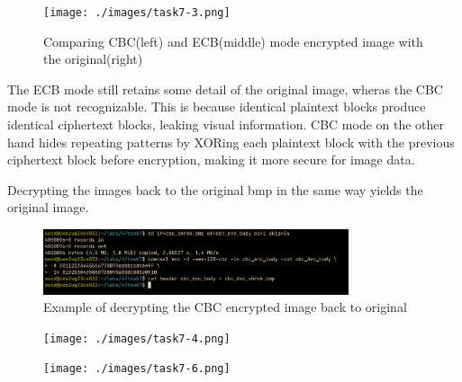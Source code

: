 \documentclass[12pt,a4paper]{article}
\begin{document}
\begin{figure}[H]
    \centering
    \texttt{[image: ./images/task7-3.png]} 
    \caption{Comparing CBC(left) and ECB(middle) mode encrypted image with the original(right)}
\end{figure}

The ECB mode still retains some detail of the original image, wheras the CBC mode is not recognizable. This is because identical plaintext blocks produce identical
ciphertext blocks, leaking visual information. CBC mode on the other hand hides repeating patterns by XORing each plaintext block with the previous ciphertext block before encryption, making it more secure for image data.


Decrypting the images back to the original bmp in the same way yields the original image.

\begin{figure}[H]
    \centering
    \includegraphics[width=0.8\textwidth]{./images/task7-5.png} 
    \caption{Example of decrypting the CBC encrypted image back to original}
\end{figure}

\begin{figure}[H]
    \centering
    \texttt{[image: ./images/task7-4.png]} 
\end{figure}


\begin{figure}[H]
    \centering
    \texttt{[image: ./images/task7-6.png]} 
\end{figure}
\end{document}
